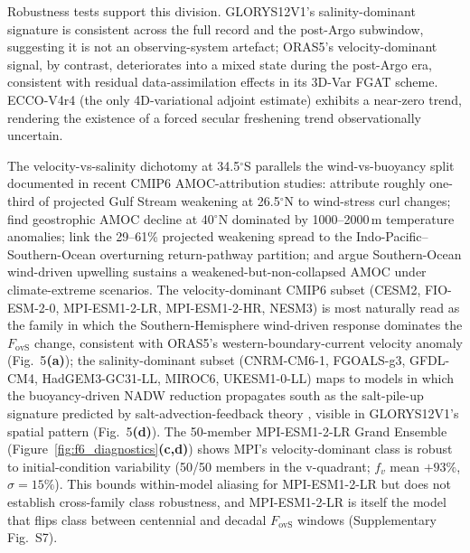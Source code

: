 \documentclass[11pt,a4paper]{article}
\begin{document}
Robustness tests support this division. GLORYS12V1's salinity-dominant signature is consistent across the full record and the post-Argo subwindow, suggesting it is not an observing-system artefact; ORAS5's velocity-dominant signal, by contrast, deteriorates into a mixed state during the post-Argo era, consistent with residual data-assimilation effects in its 3D-Var FGAT scheme. ECCO-V4r4 (the only 4D-variational adjoint estimate) exhibits a near-zero trend, rendering the existence of a forced secular freshening trend observationally uncertain.

The velocity-vs-salinity dichotomy at 34.5$^\circ$S parallels the wind-vs-buoyancy split documented in recent CMIP6 AMOC-attribution studies: \citet{Asbjornsen2023} attribute roughly one-third of projected Gulf Stream weakening at 26.5$^\circ$N to wind-stress curl changes; \citet{Levang2020} find geostrophic AMOC decline at 40$^\circ$N dominated by 1000--2000\,m temperature anomalies; \citet{Baker2023} link the 29--61\% projected weakening spread to the Indo-Pacific--Southern-Ocean overturning return-pathway partition; and \citet{Baker2025} argue Southern-Ocean wind-driven upwelling sustains a weakened-but-non-collapsed AMOC under climate-extreme scenarios. The velocity-dominant CMIP6 subset (CESM2, FIO-ESM-2-0, MPI-ESM1-2-LR, MPI-ESM1-2-HR, NESM3) is most naturally read as the family in which the Southern-Hemisphere wind-driven response dominates the $F_{\mathrm{ovS}}$ change, consistent with ORAS5's western-boundary-current velocity anomaly (Fig.~5\textbf{(a)}); the salinity-dominant subset (CNRM-CM6-1, FGOALS-g3, GFDL-CM4, HadGEM3-GC31-LL, MIROC6, UKESM1-0-LL) maps to models in which the buoyancy-driven NADW reduction propagates south as the salt-pile-up signature predicted by salt-advection-feedback theory \citep{Stommel1961, deVriesWeber2005}, visible in GLORYS12V1's spatial pattern (Fig.~5\textbf{(d)}). The 50-member MPI-ESM1-2-LR Grand Ensemble (Figure~\ref{fig:f6_diagnostics}\textbf{(c,d)}) shows MPI's velocity-dominant class is robust to initial-condition variability (50/50 members in the v-quadrant; $f_v$ mean $+93\%$, $\sigma = 15\%$). This bounds within-model aliasing for MPI-ESM1-2-LR but does not establish cross-family class robustness, and MPI-ESM1-2-LR is itself the model that flips class between centennial and decadal $F_{\mathrm{ovS}}$ windows (Supplementary Fig.~S7).
\end{document}
